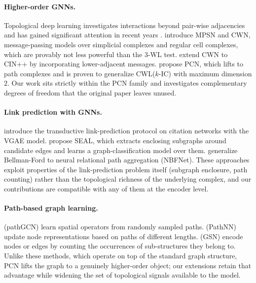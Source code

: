 \documentclass[letterpaper]{article} %
\begin{document}
\paragraph{Higher-order GNNs.} Topological deep learning investigates interactions beyond pair-wise adjacencies and has gained significant attention in recent years \cite{papillon_architectures_2023, hajij_topological_2023}. \citeauthor{bodnar_weisfeiler_2021} introduce MPSN and CWN, message-passing models over simplicial complexes and regular cell complexes, which are provably not less powerful than the \(3\)-WL test. \citeauthor{giusti_cin_2023} extend CWN to CIN++ by incorporating lower-adjacent messages. \citeauthor{truong_weisfeiler_2024} propose PCN, which lifts to path complexes and is proven to generalize CWL(\(k\)-IC) with maximum dimension \(2\). Our work sits strictly within the PCN family and investigates complementary degrees of freedom that the original paper leaves unused.

\paragraph{Link prediction with GNNs.} \citeauthor{kipf_variational_2016} introduce the transductive link-prediction protocol on citation networks with the VGAE model. \citeauthor{zhang_link_2018} propose SEAL, which extracts enclosing subgraphs around candidate edges and learns a graph-classification model over them. \citeauthor{zhu_neural_2021} generalize Bellman-Ford to neural relational path aggregation (NBFNet). These approaches exploit properties of the link-prediction problem itself (subgraph enclosure, path counting) rather than the topological richness of the underlying complex, and our contributions are compatible with any of them at the encoder level.

\paragraph{Path-based graph learning.} \citeauthor{eliasof_pathgcn_2022} (pathGCN) learn spatial operators from randomly sampled paths. \citeauthor{michel_expressive_2023} (PathNN) update node representations based on paths of different lengths. \citeauthor{bouritsas_improving_2021} (GSN) encode nodes or edges by counting the occurrences of sub-structures they belong to. Unlike these methods, which operate on top of the standard graph structure, PCN lifts the graph to a genuinely higher-order object; our extensions retain that advantage while widening the set of topological signals available to the model.
\end{document}
